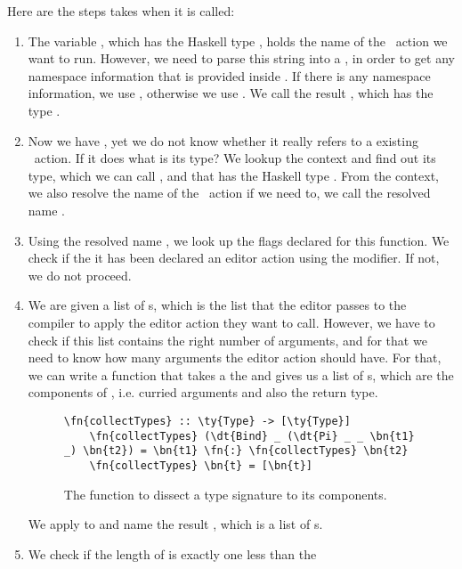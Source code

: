 Here are the steps  takes when it is called:
\begin{enumerate}
  \item The variable , which has the Haskell type ,
    holds the name of the \Elab\ action we want to run. However, we need
    to parse this string into a , in order to get any namespace
    information that is provided inside .
    If there is any namespace information, we use , otherwise we use
    .  We call the result , which has the type .
  \item Now we have , yet we do not know whether it really refers to a
    existing \Elab\ action. If it does what is its type?
    We lookup the context and find out its type, which we can call , and
    that has the Haskell type . From the context, we also resolve the
    name of the \Elab\ action if we need to, we call the resolved name .
  \item Using the resolved name , we look up the flags declared for this function.
    We check if the it has been declared an editor action using the
     modifier.  If not, we do not proceed.
  \item We are given a list of s, which is the list that the editor
    passes to the compiler to apply the editor action they want to call.
    However, we have to check if this list contains the right number of
    arguments, and for that we need to know how many arguments the editor action should have.
    For that, we can write a function  that takes a the
      and gives us a list of s, which are the
    components of , i.e.  curried arguments and also the return type.
    \begin{figure}[ht]
    \caption{The function  to dissect a type signature to its components.}
    \label{code:collectTypes}
    \begin{Verbatim}[framesep=2mm, label=\footnotesize{\normalfont{Haskell}}, labelposition=topline]
    \fn{collectTypes} :: \ty{Type} -> [\ty{Type}]
    \fn{collectTypes} (\dt{Bind} _ (\dt{Pi} _ _ \bn{t1} _) \bn{t2}) = \bn{t1} \fn{:} \fn{collectTypes} \bn{t2}
    \fn{collectTypes} \bn{t} = [\bn{t}]
    \end{Verbatim}
    \end{figure}
    We apply  to  and name the result ,
    which is a list of s.
  \item We check if the length of  is exactly one less than the

\end{enumerate}

